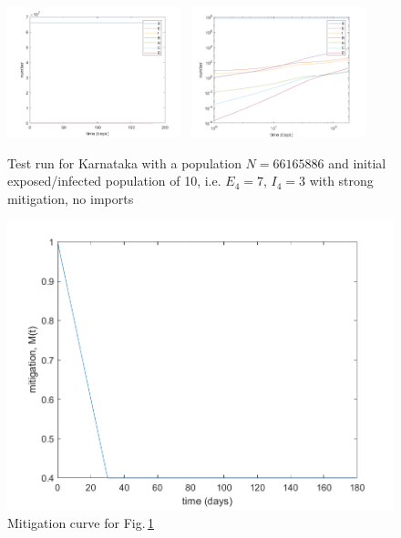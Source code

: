 \documentclass{article}
\begin{document}
\begin{figure}[H]
    \centering
    \includegraphics[width=0.45\textwidth]{neherlab-comparison/real-time-plot-2}~
    \includegraphics[width=0.45\textwidth]{neherlab-comparison/log-log-plot-2}
    \caption{Test run for Karnataka with a population $N = 66165886$ and initial exposed/infected population of 10, i.e. $E_4 = 7$, $I_4 = 3$ with strong mitigation, no imports}
    \label{fig:dynamics-strong-mitigation}
\end{figure}


\begin{figure}[H]
    \centering
    \includegraphics[width=\textwidth]{neherlab-comparison/strong-mitigation}
    \caption{Mitigation curve for Fig.\,\ref{fig:dynamics-strong-mitigation}}
\end{figure}
\end{document}
